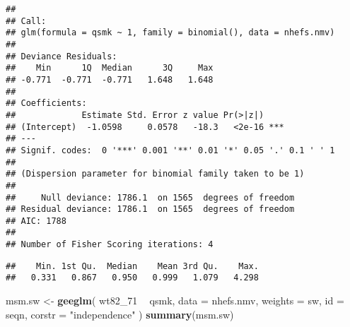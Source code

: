 \documentclass[
  10pt,
]{book}
\newenvironment{Shaded}{\begin{snugshade}}{\end{snugshade}}
\newcommand{\DataTypeTok}[1]{\textcolor[rgb]{0.13,0.29,0.53}{#1}}
\newcommand{\DecValTok}[1]{\textcolor[rgb]{0.00,0.00,0.81}{#1}}
\newcommand{\KeywordTok}[1]{\textcolor[rgb]{0.13,0.29,0.53}{\textbf{#1}}}
\newcommand{\NormalTok}[1]{#1}
\newcommand{\OperatorTok}[1]{\textcolor[rgb]{0.81,0.36,0.00}{\textbf{#1}}}
\newcommand{\StringTok}[1]{\textcolor[rgb]{0.31,0.60,0.02}{#1}}
\begin{document}
\begin{verbatim}
## 
## Call:
## glm(formula = qsmk ~ 1, family = binomial(), data = nhefs.nmv)
## 
## Deviance Residuals: 
##    Min      1Q  Median      3Q     Max  
## -0.771  -0.771  -0.771   1.648   1.648  
## 
## Coefficients:
##             Estimate Std. Error z value Pr(>|z|)    
## (Intercept)  -1.0598     0.0578   -18.3   <2e-16 ***
## ---
## Signif. codes:  0 '***' 0.001 '**' 0.01 '*' 0.05 '.' 0.1 ' ' 1
## 
## (Dispersion parameter for binomial family taken to be 1)
## 
##     Null deviance: 1786.1  on 1565  degrees of freedom
## Residual deviance: 1786.1  on 1565  degrees of freedom
## AIC: 1788
## 
## Number of Fisher Scoring iterations: 4
\end{verbatim}

\begin{Shaded}
\end{Shaded}

\begin{verbatim}
##    Min. 1st Qu.  Median    Mean 3rd Qu.    Max. 
##   0.331   0.867   0.950   0.999   1.079   4.298
\end{verbatim}

\begin{Shaded}
\begin{Highlighting}[]
\NormalTok{msm.sw <-}\StringTok{ }\KeywordTok{geeglm}\NormalTok{(}
\NormalTok{  wt82_}\DecValTok{71} \OperatorTok{~}\StringTok{ }\NormalTok{qsmk,}
  \DataTypeTok{data =}\NormalTok{ nhefs.nmv,}
  \DataTypeTok{weights =}\NormalTok{ sw,}
  \DataTypeTok{id =}\NormalTok{ seqn,}
  \DataTypeTok{corstr =} \StringTok{"independence"}
\NormalTok{)}
\KeywordTok{summary}\NormalTok{(msm.sw)}
\end{Highlighting}
\end{Shaded}
\end{document}

